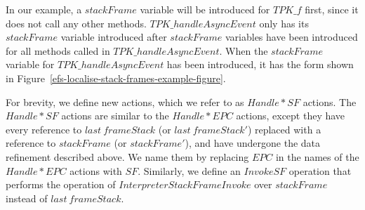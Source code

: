 In our example, a $stackFrame$ variable will be introduced for
$TPK\_f$ first, since it does not call any other methods.
$TPK\_handleAsyncEvent$ only has its $stackFrame$ variable introduced
after $stackFrame$ variables have been introduced for all methods
called in $TPK\_handleAsyncEvent$.
When the $stackFrame$ variable for $TPK\_handleAsyncEvent$ has been
introduced, it has the form shown in
Figure~\ref{efs-localise-stack-frames-example-figure}.

For brevity, we define new actions, which we refer to as $Handle*SF$
actions.
The $Handle*SF$ actions are similar to the $Handle*EPC$ actions,
except they have every reference to $last~frameStack$ (or
$last~frameStack'$) replaced with a reference to $stackFrame$ (or
$stackFrame'$), and have undergone the data refinement described
above.
We name them by replacing $EPC$ in the names of the $Handle*EPC$
actions with $SF$.
Similarly, we define an $InvokeSF$ operation that performs the
operation of $InterpreterStackFrameInvoke$ over $stackFrame$ instead
of $last~frameStack$.


